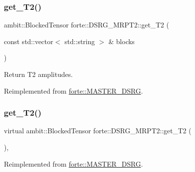 \subsubsection{\texorpdfstring{get\+\_\+\+T2()}{get\_T2()}\hspace{0.1cm}{\footnotesize\ttfamily [1/2]}}
{\footnotesize\ttfamily ambit\+::\+Blocked\+Tensor forte\+::\+D\+S\+R\+G\+\_\+\+M\+R\+P\+T2\+::get\+\_\+\+T2 (\begin{DoxyParamCaption}\item[{const std\+::vector$<$ std\+::string $>$ \&}]{blocks }\end{DoxyParamCaption})\hspace{0.3cm}{\ttfamily [virtual]}}



Return T2 amplitudes. 



Reimplemented from \mbox{\hyperlink{classforte_1_1_m_a_s_t_e_r___d_s_r_g_a2087fce00f429361e194be03c0eb668d}{forte\+::\+M\+A\+S\+T\+E\+R\+\_\+\+D\+S\+RG}}.

\mbox{\label{classforte_1_1_d_s_r_g___m_r_p_t2_af60895decfd8d368a6b61648b8f82310}} 
\subsubsection{\texorpdfstring{get\+\_\+\+T2()}{get\_T2()}\hspace{0.1cm}{\footnotesize\ttfamily [2/2]}}
{\footnotesize\ttfamily virtual ambit\+::\+Blocked\+Tensor forte\+::\+D\+S\+R\+G\+\_\+\+M\+R\+P\+T2\+::get\+\_\+\+T2 (\begin{DoxyParamCaption}{ }\end{DoxyParamCaption})\hspace{0.3cm}{\ttfamily [inline]}, {\ttfamily [virtual]}}



Reimplemented from \mbox{\hyperlink{classforte_1_1_m_a_s_t_e_r___d_s_r_g_a409d404b009c1c4c17b07beb62d7e280}{forte\+::\+M\+A\+S\+T\+E\+R\+\_\+\+D\+S\+RG}}.

\mbox{\label{classforte_1_1_d_s_r_g___m_r_p_t2_a0a07a976153924206ab3e0e9870f7ae1}} 
